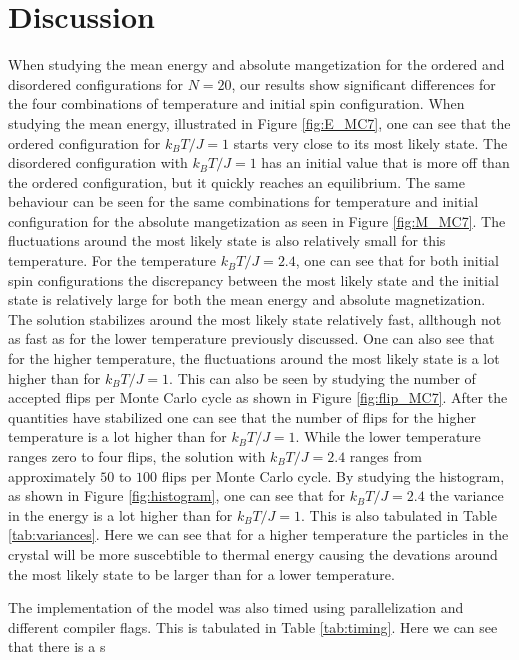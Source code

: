 \documentclass[twocolumn]{aastex62}
\begin{document}
\section{Discussion} \label{sec:discussion}
When studying the mean energy and absolute mangetization for the ordered and
disordered configurations for $N=20$, our results show significant differences
for the four combinations of temperature and initial spin configuration. When
studying the mean energy, illustrated in Figure \ref{fig:E_MC7}, one can see
that the ordered configuration for $k_BT/J=1$ starts very close to its most
likely state. The disordered configuration with $k_BT/J=1$ has an initial value
that is more off than the ordered configuration, but it quickly reaches an
equilibrium. The same behaviour can be seen for the same combinations for
temperature and initial configuration for the absolute mangetization as seen in
Figure \ref{fig:M_MC7}. The fluctuations around the most likely state is also
relatively small for this temperature. For the temperature $k_BT/J=2.4$, one can
see that for both initial spin configurations the discrepancy between
the most likely state and the initial state is relatively large for both the
mean energy and absolute magnetization. The solution stabilizes around the most
likely state relatively fast, allthough not as fast as for the lower temperature
previously discussed. One can also see that for the higher temperature, the
fluctuations around the most likely state is a lot higher than for $k_BT/J =1$.
This can also be seen by studying the number of accepted flips per Monte Carlo
cycle as shown in Figure \ref{fig:flip_MC7}. After the quantities have
stabilized one can see that the number of flips for the higher temperature is a
lot higher than for $k_BT/J=1$. While the lower temperature ranges zero to four
flips, the solution with $k_BT/J=2.4$ ranges from approximately $50$ to $100$
flips per Monte Carlo cycle. By studying the histogram, as shown in Figure
\ref{fig:histogram}, one can see that for $k_BT/J=2.4$ the variance in the
energy is a lot higher than for $k_BT/J=1$. This is also tabulated in Table
\ref{tab:variances}. Here we can see that for a higher temperature the particles
in the crystal will be more suscebtible to thermal energy causing the devations
around the most likely state to be larger than for a lower temperature.\\\indent

The implementation of the model was also timed using parallelization and
different compiler flags. This is tabulated in Table \ref{tab:timing}. Here we
can see that there is a s
\end{document}
